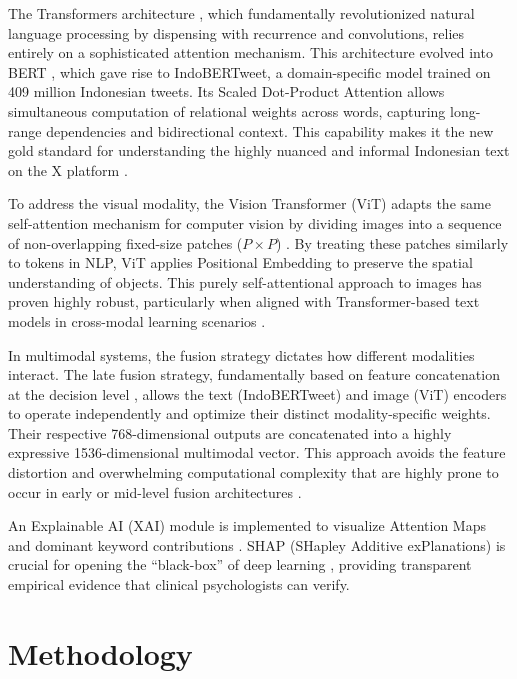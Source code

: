 \documentclass[conference]{IEEEtran}
\begin{document}
The Transformers architecture \cite{b_vaswani}, which fundamentally revolutionized natural language processing by dispensing with recurrence and convolutions, relies entirely on a sophisticated attention mechanism. This architecture evolved into
BERT \cite{b_devlin}, which gave rise to IndoBERTweet, a domain-specific model trained on
409 million Indonesian tweets. Its Scaled Dot-Product Attention
allows simultaneous computation of relational weights across words, capturing long-range dependencies and bidirectional context. This capability makes it the new gold standard for understanding the highly nuanced and informal Indonesian
text on the X platform \cite{b_koto}.

To address the visual modality, the Vision Transformer (ViT) adapts the same self-attention mechanism
for computer vision by dividing images into a sequence of non-overlapping
fixed-size patches ($P \times P$) \cite{b_dosovitskiy}. By treating these patches similarly to tokens in NLP, ViT applies Positional
Embedding to preserve the spatial understanding of objects. This purely self-attentional approach to images has
proven highly robust, particularly when aligned with Transformer-based text models
in cross-modal learning scenarios \cite{b_radford}. 

In multimodal systems, the fusion strategy dictates how different modalities interact. The late fusion strategy, fundamentally based on feature
concatenation at the decision level \cite{b_kiela}, allows the text (IndoBERTweet) and image (ViT)
encoders to operate independently and optimize their distinct modality-specific weights. Their respective 768-dimensional outputs
are concatenated into a highly expressive 1536-dimensional multimodal vector. This approach avoids the
feature distortion and overwhelming computational complexity that are highly prone to occur in early or mid-level fusion architectures \cite{b_lu}.

An Explainable AI (XAI) module is implemented to visualize Attention
Maps and dominant keyword contributions \cite{b_vig}. SHAP
(SHapley Additive exPlanations) is crucial for opening the
``black-box'' of deep learning \cite{b_lan}, providing transparent
empirical evidence that clinical psychologists can verify.

\section{Methodology}
\end{document}
